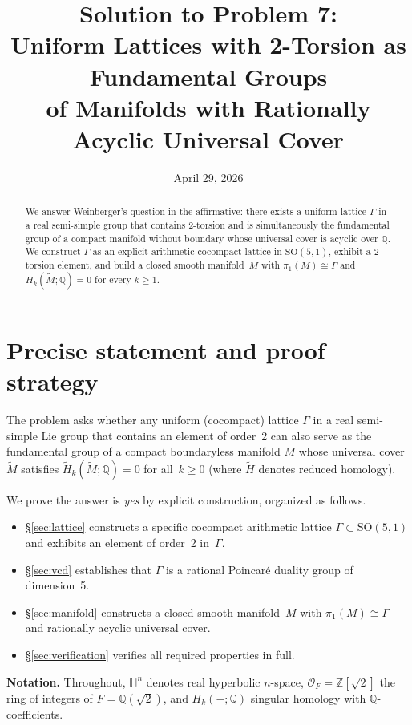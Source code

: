 \documentclass[12pt]{article}
\title{Solution to Problem 7:\\
Uniform Lattices with 2-Torsion as Fundamental Groups\\
of Manifolds with Rationally Acyclic Universal Cover}
\author{}
\date{April 29, 2026}
\theoremstyle{definition}
\theoremstyle{remark}
\begin{document}
\maketitle

\begin{abstract}
We answer Weinberger's question in the affirmative: there exists a uniform lattice
$\Gamma$ in a real semi-simple group that contains 2-torsion and is simultaneously
the fundamental group of a compact manifold without boundary whose universal cover
is acyclic over $\mathbb{Q}$.
We construct $\Gamma$ as an explicit arithmetic cocompact lattice in
$\mathrm{SO}(5,1)$, exhibit a 2-torsion element, and build a closed smooth
manifold~$M$ with $\pi_1(M)\cong\Gamma$ and $H_k(\widetilde{M};\mathbb{Q})=0$
for every $k\geq 1$.
\end{abstract}

\section{Precise statement and proof strategy}
\label{sec:statement}

The problem asks whether any uniform (cocompact) lattice $\Gamma$ in a real
semi-simple Lie group that contains an element of order~2 can also serve as the
fundamental group of a compact boundaryless manifold $M$ whose universal cover
$\widetilde{M}$ satisfies $\widetilde{H}_k(\widetilde{M};\mathbb{Q})=0$ for
all~$k\geq 0$ (where $\widetilde{H}$ denotes reduced homology).

We prove the answer is \emph{yes} by explicit construction, organized as follows.
\begin{itemize}
  \item \S\ref{sec:lattice} constructs a specific cocompact arithmetic
        lattice $\Gamma\subset\mathrm{SO}(5,1)$ and exhibits an element of
        order~2 in~$\Gamma$.
  \item \S\ref{sec:vcd} establishes that $\Gamma$ is a rational Poincar\'e
        duality group of dimension~5.
  \item \S\ref{sec:manifold} constructs a closed smooth manifold~$M$ with
        $\pi_1(M)\cong\Gamma$ and rationally acyclic universal cover.
  \item \S\ref{sec:verification} verifies all required properties in full.
\end{itemize}

\noindent
\textbf{Notation.} Throughout, $\mathbb{H}^n$ denotes real hyperbolic $n$-space,
$\mathcal{O}_F = \mathbb{Z}[\sqrt{2}]$ the ring of integers of $F = \mathbb{Q}(\sqrt{2})$,
and $H_k(-;\mathbb{Q})$ singular homology with $\mathbb{Q}$-coefficients.
\end{document}
